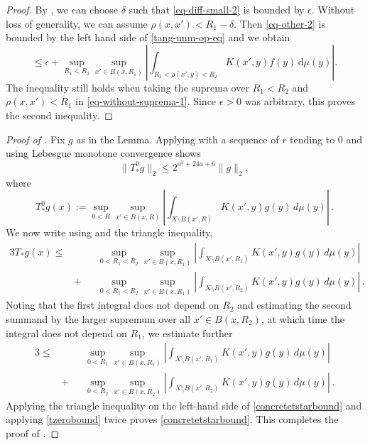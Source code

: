 \begin{proof}
By , we can choose $\delta$ such that \eqref{eq-diff-small-2} is bounded by $\epsilon$. Without loss of generality, we can assume $\rho(x,x')<R_1-\delta$. Then \eqref{eq-other-2} is bounded by the left hand side of \eqref{tang-unm-op-eq} and we obtain
\begin{equation*}
    \le \epsilon + \sup_{R_1 < R_2} \sup_{x'\in B(x,R_1)} \left|\int_{R_1<\rho(x',y)<R_2} K(x',y) f(y) \, \mathrm{d}\mu(y) \right| .
\end{equation*}
The inequality still holds when taking the suprema over $R_1<R_2$ and $\rho(x,x')<R_1$ in \eqref{eq-without-suprema-1}. Since $\epsilon>0$ was arbitrary, this proves the second inequality.
\end{proof}

\begin{proof}[Proof of ]
\leanok
Fix $g$ as in the Lemma.
Applying  with a
sequence of $r$ tending to $0$ and using Lebesgue monotone convergence shows
\begin{equation}\label{tzerobound}
    \|T_*^{0}g\|_2\le 2^{a^3+24a+6}\|g\|_2,
\end{equation}
where
\begin{equation}\label{eq-simpler--nontangential}
    T_*^{0} g(x):=\sup_{0<R}\sup_{x'\in B(x,R)} \left|\int_{X\setminus B(x',R)}
K(x',y) g(y)\, d\mu(y)\right|\, .
\end{equation}
We now write using  and the triangle inequality,
\begin{alignat*}{3}\label{concretetstartriangle}
    T_* g(x)\le&&&\sup_{0<R_1<R_2}\sup_{x'\in B(x,R_1)} \left|\int_{X\setminus B(x',R_1)}K(x',y) g(y)\, d\mu(y)\right| \\
&+&&\sup_{0<R_1<R_2}\sup_{x'\in B(x,R_1)} \left|\int_{X\setminus B(x',R_2)} K(x',y) g(y)\, d\mu(y)\right|\, .
\end{alignat*}
Noting that the first integral does not depend on $R_2$ and
estimating the second summand by the larger supremum over all
$x'\in B(x,R_2)$, at which time the integral does not depend on $R_1$, we estimate further
\begin{alignat*}{3}
    \le&&&\sup_{0<R_1}\sup_{x'\in B(x,R_1)} \left|\int_{X\setminus B(x',R_1)}K(x',y) g(y)\, d\mu(y)\right| \\
    &+  &&\sup_{0<R_2}\sup_{x'\in B(x,R_2)} \left|\int_{X\setminus B(x',R_2)} K(x',y) g(y)\, d\mu(y)\right|\, .
\end{alignat*}
    Applying the triangle inequality on the left-hand side
    of \eqref{concretetstarbound} and applying
     \eqref{tzerobound} twice
    proves \eqref{concretetstarbound}.
    This completes the proof of .
\end{proof}





